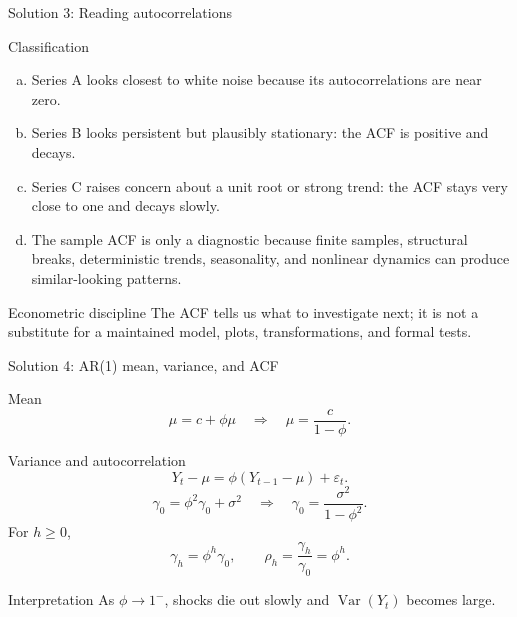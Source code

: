 \documentclass[10pt]{beamer}
\DeclareMathOperator{\Var}{Var}
\newcommand{\eps}{\varepsilon}
\begin{document}
\begin{frame}{Solution 3: Reading autocorrelations}
\label{s3}
\small
\begin{exampleblock}{Classification}
\begin{enumerate}[(a)]
  \item Series A looks closest to white noise because its autocorrelations are near zero.
  \item Series B looks persistent but plausibly stationary: the ACF is positive and decays.
  \item Series C raises concern about a unit root or strong trend: the ACF stays very close to one and decays slowly.
  \item The sample ACF is only a diagnostic because finite samples, structural breaks, deterministic trends, seasonality, and nonlinear dynamics can produce similar-looking patterns.
\end{enumerate}
\end{exampleblock}

\begin{alertblock}{Econometric discipline}
The ACF tells us what to investigate next; it is not a substitute for a maintained model, plots, transformations, and formal tests.
\end{alertblock}
\vfill
\hfill\hyperlink{q3}{}
\end{frame}

\begin{frame}{Solution 4: AR(1) mean, variance, and ACF}
\label{s4}
\footnotesize
\begin{exampleblock}{Mean}
\[
\mu=c+\phi\mu
\quad\Rightarrow\quad
\mu=\frac{c}{1-\phi}.
\]
\end{exampleblock}

\begin{exampleblock}{Variance and autocorrelation}
\[
Y_t-\mu=\phi(Y_{t-1}-\mu)+\eps_t.
\]
\[
\gamma_0=\phi^2\gamma_0+\sigma^2
\quad\Rightarrow\quad
\gamma_0=\frac{\sigma^2}{1-\phi^2}.
\]
For $h\geq 0$,
\[
\gamma_h=\phi^h\gamma_0,
\qquad
\rho_h=\frac{\gamma_h}{\gamma_0}=\phi^h.
\]
\end{exampleblock}

\begin{block}{Interpretation}
As $\phi\to 1^-$, shocks die out slowly and $\Var(Y_t)$ becomes large.
\end{block}
\vfill
\hfill\hyperlink{q4}{}
\end{frame}
\end{document}
